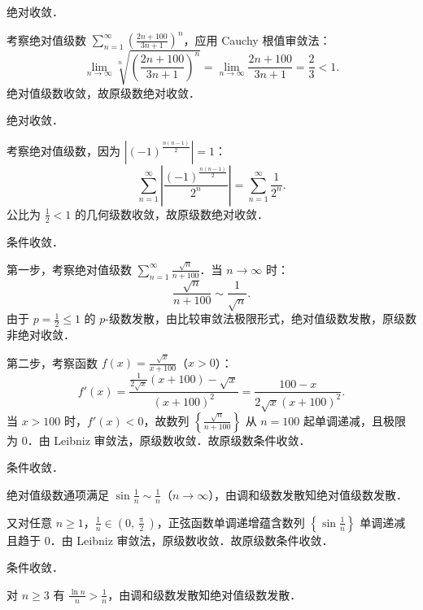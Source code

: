 \begin{solution}
     绝对收敛．

    考察绝对值级数 $\sum_{n=1}^\infty \left(\frac{2n + 100}{3n + 1}\right)^n$，应用 Cauchy 根值审敛法：
    \begin{equation}
        \lim_{n\to\infty} \sqrt[n]{\left(\frac{2n + 100}{3n + 1}\right)^n} = \lim_{n\to\infty} \frac{2n + 100}{3n + 1} = \frac{2}{3} < 1.
    \end{equation}
    绝对值级数收敛，故原级数绝对收敛．

     绝对收敛．

    考察绝对值级数，因为 $\left|(-1)^{\frac{n(n-1)}{2}}\right| = 1$：
    \begin{equation}
        \sum_{n=1}^\infty \left| \frac{(-1)^{\frac{n(n-1)}{2}}}{2^n} \right| = \sum_{n=1}^\infty \frac{1}{2^n}.
    \end{equation}
    公比为 $\frac{1}{2} < 1$ 的几何级数收敛，故原级数绝对收敛．

     条件收敛．

    第一步，考察绝对值级数 $\sum_{n=1}^\infty \frac{\sqrt{n}}{n + 100}$．当 $n \to \infty$ 时：
    \begin{equation}
        \frac{\sqrt{n}}{n + 100} \sim \frac{1}{\sqrt{n}}.
    \end{equation}
    由于 $p = \frac{1}{2} \leqslant 1$ 的 $p$-级数发散，由比较审敛法极限形式，绝对值级数发散，原级数非绝对收敛．

    第二步，考察函数 $f(x) = \frac{\sqrt{x}}{x + 100}$（$x > 0$）：
    \begin{equation}
        f'(x) = \frac{\frac{1}{2\sqrt{x}}(x + 100) - \sqrt{x}}{(x + 100)^2} = \frac{100 - x}{2\sqrt{x}(x + 100)^2}.
    \end{equation}
    当 $x > 100$ 时，$f'(x) < 0$，故数列 $\left\{ \frac{\sqrt{n}}{n + 100} \right\}$ 从 $n = 100$ 起单调递减，且极限为 $0$．由 Leibniz 审敛法，原级数收敛．故原级数条件收敛．

     条件收敛．

    绝对值级数通项满足 $\sin\frac{1}{n} \sim \frac{1}{n}$（$n \to \infty$），由调和级数发散知绝对值级数发散．

    又对任意 $n \geqslant 1$，$\frac{1}{n} \in \left(0, \frac{\uppi}{2}\right)$，正弦函数单调递增蕴含数列 $\left\{\sin\frac{1}{n}\right\}$ 单调递减且趋于 $0$．由 Leibniz 审敛法，原级数收敛．故原级数条件收敛．

     条件收敛．

    对 $n \geqslant 3$ 有 $\frac{\ln n}{n} > \frac{1}{n}$，由调和级数发散知绝对值级数发散．


\end{solution}
